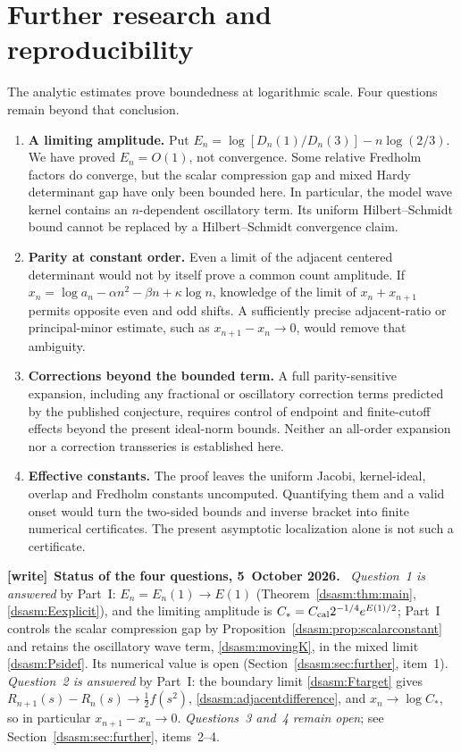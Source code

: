 \documentclass[11pt,letterpaper]{article}
\theoremstyle{remark}\newtheorem{remark}[theorem]{Remark}
\newenvironment{writenote}[1][]{\par\smallskip\begingroup\small
 \noindent\textbf{[write]}\if\relax\detokenize{#1}\relax\else~\textbf{#1.}\fi\ }%
 {\par\endgroup\smallskip}
\begin{document}
\section{Further research and reproducibility}
\label{dsasm:log:sec:scope}
The analytic estimates prove boundedness at logarithmic scale. Four
questions remain beyond that conclusion.
\begin{enumerate}
\item \textbf{A limiting amplitude.} Put
$E_n=\log[D_n(1)/D_n(3)]-n\log(2/3)$. We have proved $E_n=O(1)$,
not convergence. Some relative Fredholm factors do converge, but the
scalar compression gap and mixed Hardy determinant gap have only
been bounded here. In particular, the model wave kernel contains an
$n$-dependent oscillatory term. Its uniform Hilbert--Schmidt bound
cannot be replaced by a Hilbert--Schmidt convergence claim.
\item \textbf{Parity at constant order.} Even a limit of the adjacent
centered determinant would not by itself prove a common count
amplitude. If
$x_n=\log a_n-\alpha n^2-\beta n+\kappa\log n$, knowledge of the
limit of $x_n+x_{n+1}$ permits opposite even and odd shifts.
A sufficiently precise adjacent-ratio or principal-minor estimate,
such as $x_{n+1}-x_n\to0$, would remove that ambiguity.
\item \textbf{Corrections beyond the bounded term.} A full
parity-sensitive expansion, including any fractional or oscillatory
correction terms predicted by the published conjecture, requires
control of endpoint and finite-cutoff effects beyond the present
ideal-norm bounds. Neither an all-order expansion nor a correction
transseries is established here.
\item \textbf{Effective constants.} The proof leaves the uniform
Jacobi, kernel-ideal, overlap and Fredholm constants uncomputed.
Quantifying them and a valid onset would turn the two-sided bounds
and inverse bracket into finite numerical certificates. The present
asymptotic localization alone is not such a certificate.
\end{enumerate}
\begin{writenote}[Status of the four questions, 5~October 2026]
\emph{Question~1 is answered} by Part~I: $E_n=E_n(1)\to E(1)$ (Theorem~\ref{dsasm:thm:main}, \eqref{dsasm:Eexplicit}), and the limiting amplitude is $C_*=C_{\rm cal}2^{-1/4}e^{E(1)/2}$; Part~I controls the scalar compression gap by Proposition~\ref{dsasm:prop:scalarconstant} and retains the oscillatory wave term, \eqref{dsasm:movingK}, in the mixed limit \eqref{dsasm:Psidef}. Its numerical value is open (Section~\ref{dsasm:sec:further}, item~1). \emph{Question~2 is answered} by Part~I: the boundary limit \eqref{dsasm:Ftarget} gives $R_{n+1}(s)-R_n(s)\to\frac12f(s^2)$, \eqref{dsasm:adjacentdifference}, and $x_n\to\log C_*$, so in particular $x_{n+1}-x_n\to0$. \emph{Questions~3 and~4 remain open}; see Section~\ref{dsasm:sec:further}, items~2--4.
\end{writenote}
\end{document}
